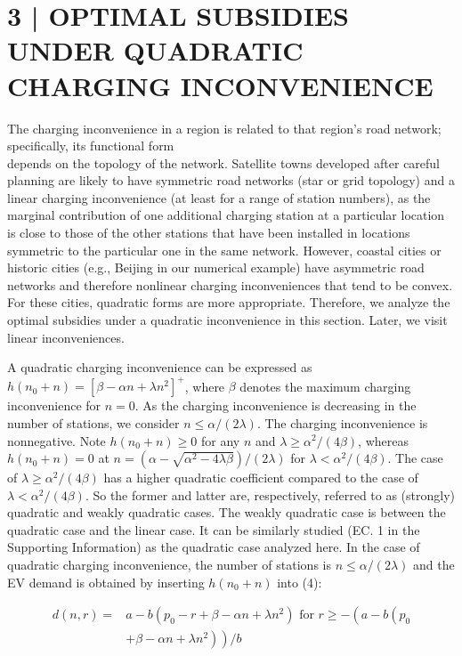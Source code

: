 \documentclass[10pt]{article}
\begin{document}
\section*{3 | OPTIMAL SUBSIDIES UNDER QUADRATIC CHARGING INCONVENIENCE}
The charging inconvenience in a region is related to that region's road network; specifically, its functional form\\
depends on the topology of the network. Satellite towns developed after careful planning are likely to have symmetric road networks (star or grid topology) and a linear charging inconvenience (at least for a range of station numbers), as the marginal contribution of one additional charging station at a particular location is close to those of the other stations that have been installed in locations symmetric to the particular one in the same network. However, coastal cities or historic cities (e.g., Beijing in our numerical example) have asymmetric road networks and therefore nonlinear charging inconveniences that tend to be convex. For these cities, quadratic forms are more appropriate. Therefore, we analyze the optimal subsidies under a quadratic inconvenience in this section. Later, we visit linear inconveniences.

A quadratic charging inconvenience can be expressed as $h\left(n_{0}+n\right)=\left[\beta-\alpha n+\lambda n^{2}\right]^{+}$, where $\beta$ denotes the maximum charging inconvenience for $n=0$. As the charging inconvenience is decreasing in the number of stations, we consider $n \leq \alpha /(2 \lambda)$. The charging inconvenience is nonnegative. Note $h\left(n_{0}+n\right) \geq 0$ for any $n$ and $\lambda \geq \alpha^{2} /(4 \beta)$, whereas $h\left(n_{0}+n\right)=0$ at $n=\left(\alpha-\sqrt{\alpha^{2}-4 \lambda \beta}\right) /(2 \lambda)$ for $\lambda<\alpha^{2} /(4 \beta)$. The case of $\lambda \geq \alpha^{2} /(4 \beta)$ has a higher quadratic coefficient compared to the case of $\lambda<\alpha^{2} /(4 \beta)$. So the former and latter are, respectively, referred to as (strongly) quadratic and weakly quadratic cases. The weakly quadratic case is between the quadratic case and the linear case. It can be similarly studied (EC. 1 in the Supporting Information) as the quadratic case analyzed here. In the case of quadratic charging inconvenience, the number of stations is $n \leq \alpha /(2 \lambda)$ and the EV demand is obtained by inserting $h\left(n_{0}+n\right)$ into (4):


\begin{align*}
d(n, r)= & a-b\left(p_{0}-r+\beta-\alpha n+\lambda n^{2}\right) \text { for } r \geq-\left(a-b\left(p_{0}\right.\right. \\
& \left.\left.+\beta-\alpha n+\lambda n^{2}\right)\right) / b \tag{5}
\end{align*}
\end{document}
